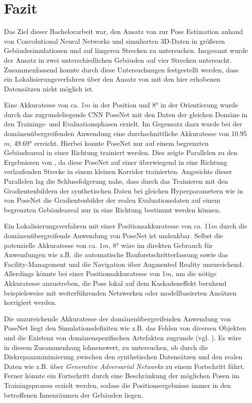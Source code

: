 
\section{Fazit}
\label{sec:kapitel_6}
Das Ziel dieser Bachelorarbeit war, den Ansatz von \citet{acharyaBIMPoseNetIndoorCamera2019} zur Pose Estimation anhand von Convolutional Neural Networks und simulierten 3D-Daten in größeren Gebäudesimulationen und auf längeren Strecken zu untersuchen.
Insgesamt wurde der Ansatz in zwei unterschiedlichen Gebäuden auf vier Strecken untersucht. Zusammenfassend konnte durch diese Untersuchungen festgestellt werden, dass ein Lokalisierungsverfahren über den Ansatz von \citet{acharyaBIMPoseNetIndoorCamera2019} mit den hier erhobenen Datensätzen nicht möglich ist.


Eine Akkuratesse von ca. 1$m$ in der Position und 8° in der Orientierung wurde durch das zugrundeliegende CNN PoseNet mit den Daten der gleichen Domäne in den Trainings- und Evaluationsphasen erzielt. Im Gegensatz dazu wurde bei der domänenübergreifenden Anwendung eine durchschnittliche Akkuratesse von 10.95$m$, 49.69° erreicht. Hierbei konnte PoseNet nur auf einem begrenzten Gebäudeareal in einer Richtung trainiert werden. Dies zeigte Parallelen zu den Ergebnissen von \citet{acharyaBIMPoseNetIndoorCamera2019}, da diese PoseNet auf einer überwiegend in eine Richtung verlaufenden Strecke in einem kleinen Korridor trainierten. Angesichts dieser Parallelen lag die Schlussfolgerung nahe, dass durch das Trainieren mit den Gradientenbildern der synthetischen Daten bei gleichen Hyperparametern wie in \cite{acharyaBIMPoseNetIndoorCamera2019} von PoseNet die Gradientenbilder der realen Evaluationsdaten auf einem begrenzten Gebäudeareal nur in eine Richtung bestimmt werden können.

Ein Lokalisierungsverfahren mit einer Positionsakkuratesse von ca. 11$m$ durch die domänenübergreifende Anwendung von PoseNet ist undenkbar. Selbst die potenzielle Akkuratesse von ca. 1$m$, 8° wäre im direkten Gebrauch für Anwendungen wie z.B. die automatische Bauforstschritterfassung sowie das Facility-Manage\-ment und die Navigation über Augmented Reality unzureichend. Allerdings könnte bei einer Positionsakkuratesse von 1$m$, um die nötige Akkuratesse anzustreben, die Pose lokal auf dem Kaskadeneffekt beruhend beispielsweise mit weiterführenden Netzwerken oder modellbasierten Ansätzen korrigiert werden.

Die unzureichende Akkuratesse der domänenübergreifenden Anwendung von PoseNet liegt den Simulationsdefiziten wie z.B. das Fehlen von diversen Objekten und die Existenz von domänenspezifischen Artefakten zugrunde (vgl. \cite{acharyaBIMPoseNetIndoorCamera2019}). Es wäre in diesem Zusammenhang lohnenswert, zu untersuchen, ob durch die Diskrepanzminimierung zwischen den synthetischen Datensätzen und den realen Daten wie z.B. über \textit{Generative Adversarial Networks} zu einem Fortschritt führt. Ferner könnte ein Fortschritt durch eine Beschränkung der möglichen Posen im Trainingsprozess erzielt werden, sodass die Positionsergebnisse immer in den betroffenen Innenräumen der Gebäuden liegen.

